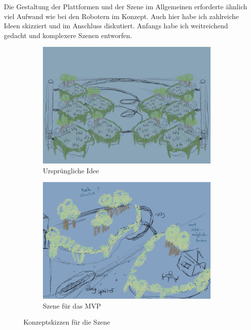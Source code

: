 \par
Die Gestaltung der Plattformen und der Szene im Allgemeinen erforderte ähnlich viel Aufwand wie bei den Robotern im Konzept. Auch hier habe ich zahlreiche Ideen skizziert und im Anschluss diskutiert. Anfangs habe ich weitreichend gedacht und komplexere Szenen entworfen.
\begin{figure}[H]
	\begin{subfigure}{0.5\textwidth}
		\centering
		\includegraphics[height=0.3\pageheight,keepaspectratio]{pics/3} 
		\caption{Ursprüngliche Idee}
	\end{subfigure}	
	\begin{subfigure}{0.5\textwidth}
		\centering
		\includegraphics[height=0.3\pageheight,keepaspectratio]{pics/4} 
		\caption{Szene für das MVP}
	\end{subfigure}	
	\caption{Konzeptskizzen für die Szene}
\end{figure}
